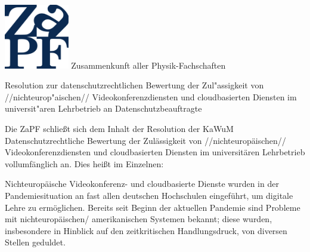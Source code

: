 \documentclass[DIV=calc]{scrartcl}
\let\oldgrqq=\grqq
\def\grqq{\oldgrqq\xspace}
\begin{document}
\hspace{0.87\textwidth}
\begin{minipage}{120pt}
	\vspace{-1.8cm}
	\includegraphics[width=80pt]{../logo.pdf}
	\centering
	\small Zusammenkunft aller Physik-Fachschaften
\end{minipage}

\begin{center}
  \huge{Resolution zur datenschutzrechtlichen Bewertung der Zul"assigkeit von //nichteurop"aischen// Videokonferenzdiensten und cloudbasierten Diensten im universit"aren Lehrbetrieb an Datenschutzbeauftragte}\vspace{.25\baselineskip}\\
  \normalsize
\end{center}
\vspace{1cm}





Die ZaPF schließt sich dem Inhalt der Resolution der KaWuM \glqq Datenschutzrechtliche Bewertung der Zulässigkeit von //nichteuropäischen// Videokonferenzdiensten und cloudbasierten Diensten im universitären Lehrbetrieb\grqq vollumfänglich an. Dies heißt im Einzelnen: 

Nichteuropäische Videokonferenz- und cloudbasierte Dienste wurden in der Pandemiesituation an fast allen deutschen Hochschulen eingeführt, um digitale Lehre zu ermöglichen. Bereits seit Beginn der aktuellen Pandemie sind Probleme mit nichteuropäischen/ amerikanischen Systemen bekannt; diese wurden, insbesondere in Hinblick auf den zeitkritischen Handlungsdruck, von diversen Stellen geduldet. 
\end{document}
